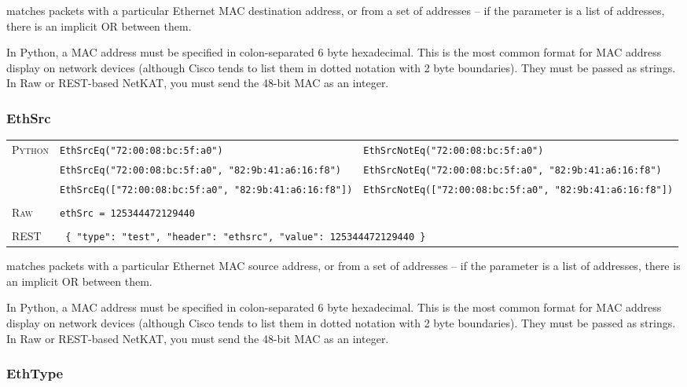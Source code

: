  matches packets with a particular Ethernet MAC destination address, or from a set of addresses -- 
if the 
parameter is a list of addresses, there is an implicit OR between them.    

In Python, a MAC address must be specified in colon-separated 6 byte hexadecimal.  This is the most common format
for MAC address display on network devices (although Cisco tends to list them in dotted notation with 2 byte
boundaries).  They must be passed as strings.  In Raw or REST-based NetKAT, you must send the 48-bit MAC as 
an integer.  

\subsubsection{EthSrc}

\bigskip
\begin{tabularx}{\linewidth}{lXX}
\textsc{Python}   & \texttt{EthSrcEq("72:00:08:bc:5f:a0")}    & \texttt{EthSrcNotEq("72:00:08:bc:5f:a0")} \\
    & \texttt{EthSrcEq("72:00:08:bc:5f:a0", "82:9b:41:a6:16:f8")}  & \texttt{EthSrcNotEq("72:00:08:bc:5f:a0", "82:9b:41:a6:16:f8")} \\
    & \texttt{EthSrcEq(["72:00:08:bc:5f:a0", "82:9b:41:a6:16:f8"])}  & \texttt{EthSrcNotEq(["72:00:08:bc:5f:a0", "82:9b:41:a6:16:f8"])} \\ \\
\textsc{Raw}    & \texttt{ethSrc = 125344472129440}     & \\ \\
\textsc{REST} & \multicolumn{2}{l}{\texttt{ \{ "type": "test", "header": "ethsrc", "value": 125344472129440 \} }} 
\end{tabularx}

 matches packets with a particular Ethernet MAC source address, or from a set of addresses -- 
if the 
parameter is a list of addresses, there is an implicit OR between them.    

In Python, a MAC address must be specified in colon-separated 6 byte hexadecimal.  This is the most common format
for MAC address display on network devices (although Cisco tends to list them in dotted notation with 2 byte
boundaries).  They must be passed as strings.  In Raw or REST-based NetKAT, you must send the 48-bit MAC as 
an integer.  

\subsubsection{EthType}

